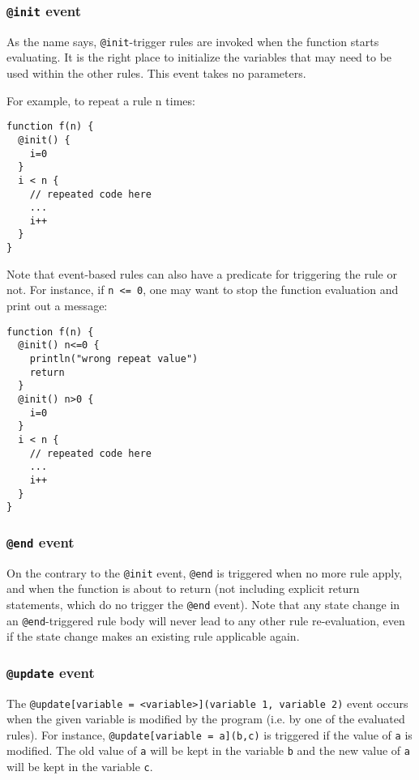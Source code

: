 \documentclass[11pt]{article}
\begin{document}
\subsubsection{\texttt{@init} event}

As the name says, \texttt{@init}-trigger rules are invoked when the function starts evaluating. It is the right place to initialize the variables that may need to be used within the other rules. This event takes no parameters.

For example, to repeat a rule n times:

\begin{lstlisting}
function f(n) {
  @init() {
    i=0
  }
  i < n {
    // repeated code here
    ...
    i++
  }
}
\end{lstlisting}

Note that event-based rules can also have a predicate for triggering the rule or not. For instance, if \texttt{n <= 0}, one may want to stop the function evaluation and print out a message:

\begin{lstlisting}
function f(n) {
  @init() n<=0 {
    println("wrong repeat value")
    return
  }
  @init() n>0 {
    i=0
  }
  i < n {
    // repeated code here
    ...
    i++
  }
}
\end{lstlisting}

\subsubsection{\texttt{@end} event}

On the contrary to the \texttt{@init} event, \texttt{@end} is triggered when no more rule apply, and when the function is about to return (not including explicit return statements, which do no trigger the \texttt{@end} event). Note that any state change in an \texttt{@end}-triggered rule body will never lead to any other rule re-evaluation, even if the state change makes an existing rule applicable again.

\subsubsection{\texttt{@update} event}

The \texttt{@update[variable = <variable>](variable 1, variable 2)} event occurs when the given variable is modified by the program (i.e. by one of the evaluated rules). For instance, \texttt{@update[variable = a](b,c)} is triggered if the value of \texttt{a} is modified. The old value of \texttt{a} will be kept in the variable \texttt{b} and the new value of \texttt{a} will be kept in the variable \texttt{c}.
\end{document}
